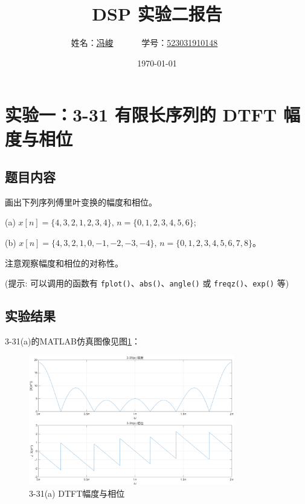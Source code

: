 \documentclass[UTF8,12pt,a4paper]{ctexart}
\title{DSP 实验二报告}
\author{
	姓名：\underline{冯峻}~~~~~~
	学号：\underline{523031910148}~~~~~~}
\date{\today}
\begin{document}
\fancyfoot[C]{\thepage}

\maketitle
\tableofcontents
\newpage

\section{实验一：3-31 有限长序列的 DTFT 幅度与相位}

\subsection{题目内容}
画出下列序列傅里叶变换的幅度和相位。

(a) $x[n] = \{4,3,2,1,2,3,4\}$, $n = \{0,1,2,3,4,5,6\}$;

(b) $x[n] = \{4,3,2,1,0,-1,-2,-3,-4\}$, $n = \{0,1,2,3,4,5,6,7,8\}$。

注意观察幅度和相位的对称性。

(提示: 可以调用的函数有 \texttt{fplot()}、\texttt{abs()}、\texttt{angle()} 或 \texttt{freqz()}、\texttt{exp()} 等)

\subsection{实验结果}

3-31(a)的MATLAB仿真图像见图\ref{fig:3-31a}：

\begin{figure}[htbp]
    \centering
    \includegraphics[width=0.8\textwidth]{3-31(a).png}
    \caption{3-31(a) DTFT幅度与相位}
    \label{fig:3-31a}
\end{figure}
\end{document}
